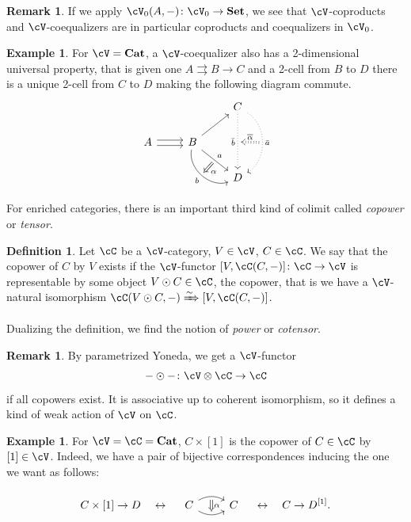\documentclass[a4paper,11pt,oneside,openany]{scrbook}
\newcommand{\catname}[1]{{\normalfont\textbf{#1}}}
\newcommand{\Set}{\catname{Set}}
\newcommand{\Cat}{\catname{Cat}}
\theoremstyle{definition}
\theoremstyle{definition}
\newtheorem{defn}[thm]{Definition} %
\newtheorem{rmk}[thm]{Remark}
\newtheorem{exmp}[thm]{Example}
\begin{document}
\begin{rmk}
    If we apply $\cV_0(A,-)\colon\cV_0\rightarrow\Set$, we see that $\cV$-coproducts and $\cV$-coequalizers are in particular coproducts and coequalizers in $\cV_0$.
\end{rmk}

\begin{exmp}
    For $\cV=\Cat$, a $\cV$-coequalizer also has a 2-dimensional universal property, that is given one $A\rightrightarrows B\rightarrow C$ and a 2-cell from $B$ to $D$ there is a unique 2-cell from $C$ to $D$ making the following diagram commute.
    \[
    \begin{tikzcd}
    	&& C\ar[dd, dotted, swap, "\bar{b}", ""{name=bbar}]\ar[dd, dotted, bend left=60, "\bar{a}", ""{name=abar}] \\
        A\ar[r, shift left,]\ar[r, shift right]
        & B\ar[ur]\ar[dr, "a", ""{name=a}]\ar[dr, bend right=60, swap, "b", ""{name=b}] \\
        && D
        \ar[Rightarrow, shorten <= .3em, shorten >= .3em, from=a, to=b, "\alpha"]
        \ar[Rightarrow, dotted, shorten <= .3em, shorten >= .3em, swap, from=abar, to=bbar, "\overline{\alpha}"]
    \end{tikzcd}
    \]
\end{exmp}

For enriched categories, there is an important third kind of colimit called \emph{copower} or \emph{tensor}.

\begin{defn}
    Let $\cC$ be a $\cV$-category, $V\in\cV$, $C\in\cC$. We say that the copower of $C$ by $V$ exists if the $\cV$-functor $[V,\cC(C,-)]\colon\cC\rightarrow\cV$ is representable by some object $V\odot C\in\cC$, the copower, that is we have a $\cV$-natural isomorphism $\cC(V\odot C,-)\xRightarrow{\sim}[V,\cC(C,-)]$.
    
    Dualizing the definition, we find the notion of \emph{power} or \emph{cotensor}.
\end{defn}

\begin{rmk}
    By parametrized Yoneda, we get a $\cV$-functor$$-\odot-\colon\cV\otimes\cC\rightarrow\cC$$if all copowers exist. It is associative up to coherent isomorphism, so it defines a kind of weak action of $\cV$ on $\cC$.
\end{rmk}

\begin{exmp}
    For $\cV=\cC=\Cat$, $C\times[1]$ is the copower of $C\in\cC$ by $[1]\in\cV$. Indeed, we have a pair of bijective correspondences inducing the one we want as follows:
    
    $$C\times[1]\rightarrow D\quad\leftrightarrow\quad
        \begin{tikzcd}
        C\ar[r, bend left, ""{name=A}]\ar[r, bend right, swap, ""{name=B}]
        & C
        \ar[Rightarrow, shorten <= .3em, shorten >= .3em, from=A, to=B, "\alpha"]
    \end{tikzcd}
    \quad\leftrightarrow\quad C\rightarrow D^{[1]}.$$
\end{exmp}
\end{document}
